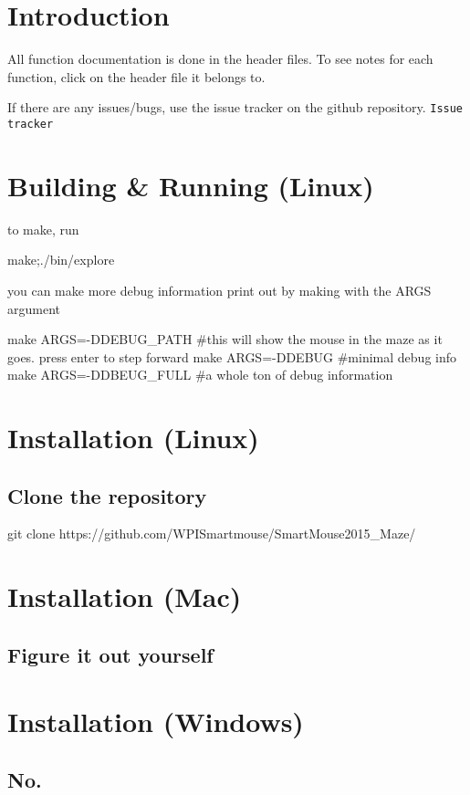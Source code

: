\section{Introduction}\label{index_intro_sec}
All function documentation is done in the header files. To see notes for each function, click on the header file it belongs to.

If there are any issues/bugs, use the issue tracker on the github repository. {\tt Issue tracker}\section{Building \& Running (\-Linux)}\label{index_run_sec_linux}
to make, run \begin{DoxyVerb} make;./bin/explore
\end{DoxyVerb}


you can make more debug information print out by making with the A\-R\-G\-S argument \begin{DoxyVerb} make ARGS=-DDEBUG_PATH #this will show the mouse in the maze as it goes. press enter to step forward
 make ARGS=-DDEBUG #minimal debug info
 make ARGS=-DDBEUG_FULL #a whole ton of debug information
\end{DoxyVerb}
\section{Installation (\-Linux)}\label{index_install_sec_linux}
\subsection{Clone the repository}\label{index_step1_linux}
\begin{DoxyVerb} git clone https://github.com/WPISmartmouse/SmartMouse2015_Maze/
\end{DoxyVerb}
\section{Installation (\-Mac)}\label{index_install_sec_mac}
\subsection{Figure it out yourself}\label{index_step1_mac}
\section{Installation (\-Windows)}\label{index_install_sec_win}
\subsection{No.}\label{index_step1_win}
